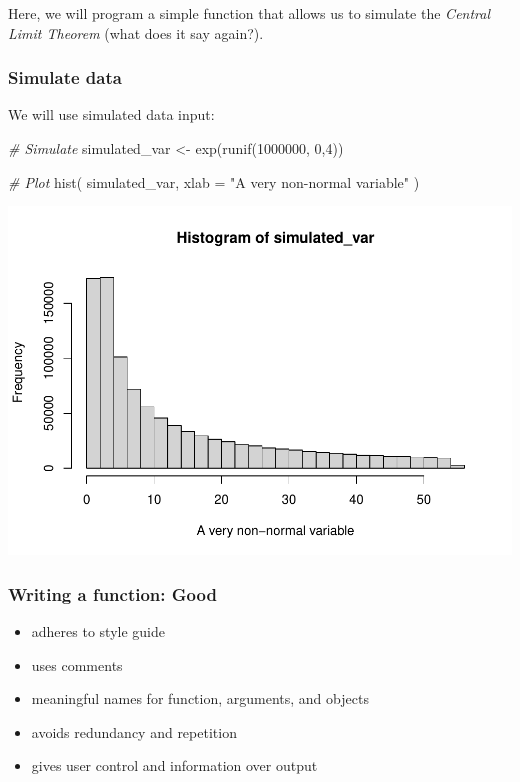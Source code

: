 \documentclass[
  11pt,
]{article}
\newenvironment{Shaded}{\begin{snugshade}}{\end{snugshade}}
\newcommand{\AttributeTok}[1]{\textcolor[rgb]{0.77,0.63,0.00}{#1}}
\newcommand{\CommentTok}[1]{\textcolor[rgb]{0.56,0.35,0.01}{\textit{#1}}}
\newcommand{\DecValTok}[1]{\textcolor[rgb]{0.00,0.00,0.81}{#1}}
\newcommand{\FunctionTok}[1]{\textcolor[rgb]{0.00,0.00,0.00}{#1}}
\newcommand{\NormalTok}[1]{#1}
\newcommand{\OtherTok}[1]{\textcolor[rgb]{0.56,0.35,0.01}{#1}}
\newcommand{\StringTok}[1]{\textcolor[rgb]{0.31,0.60,0.02}{#1}}
\providecommand{\tightlist}{%
  \setlength{\itemsep}{0pt}\setlength{\parskip}{0pt}}
\begin{document}
Here, we will program a simple function that allows us to simulate the \emph{Central Limit Theorem} (what does it say again?).

\hypertarget{simulate-data}{%
\subsubsection{Simulate data}\label{simulate-data}}

We will use simulated data input:

\begin{Shaded}
\begin{Highlighting}[]
\CommentTok{\# Simulate}
\NormalTok{simulated\_var }\OtherTok{\textless{}{-}} \FunctionTok{exp}\NormalTok{(}\FunctionTok{runif}\NormalTok{(}\DecValTok{1000000}\NormalTok{, }\DecValTok{0}\NormalTok{,}\DecValTok{4}\NormalTok{))}

\CommentTok{\# Plot}
\FunctionTok{hist}\NormalTok{(}
\NormalTok{  simulated\_var,}
  \AttributeTok{xlab =} \StringTok{"A very non{-}normal variable"}
\NormalTok{)}
\end{Highlighting}
\end{Shaded}

\includegraphics{01-lec-short_files/figure-latex/sim-data-1.pdf}

\hypertarget{writing-a-function-good}{%
\subsubsection{Writing a function: Good}\label{writing-a-function-good}}

\begin{itemize}
\tightlist
\item
  adheres to style guide
\item
  uses comments
\item
  meaningful names for function, arguments, and objects
\item
  avoids redundancy and repetition
\item
  gives user control and information over output
\end{itemize}
\end{document}

